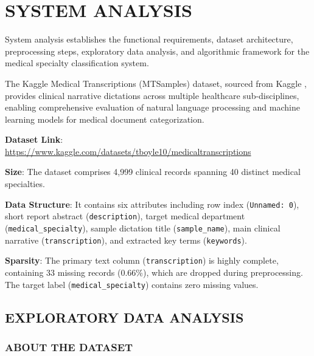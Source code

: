 \clearpage

\section{SYSTEM ANALYSIS}

System analysis establishes the functional requirements, dataset architecture, preprocessing steps, exploratory data analysis, and algorithmic framework for the medical specialty classification system.

The Kaggle Medical Transcriptions (MTSamples) dataset, sourced from Kaggle \cite{mtsamples_dataset}, provides clinical narrative dictations across multiple healthcare sub-disciplines, enabling comprehensive evaluation of natural language processing and machine learning models for medical document categorization.

\textbf{Dataset Link}: \url{https://www.kaggle.com/datasets/tboyle10/medicaltranscriptions}

\textbf{Size}: The dataset comprises 4,999 clinical records spanning 40 distinct medical specialties.

\textbf{Data Structure}: It contains six attributes including row index (\texttt{Unnamed: 0}), short report abstract (\texttt{description}), target medical department (\texttt{medical\_specialty}), sample dictation title (\texttt{sample\_name}), main clinical narrative (\texttt{transcription}), and extracted key terms (\texttt{keywords}).

\textbf{Sparsity}: The primary text column (\texttt{transcription}) is highly complete, containing 33 missing records (0.66\%), which are dropped during preprocessing. The target label (\texttt{medical\_specialty}) contains zero missing values.

\subsection{EXPLORATORY DATA ANALYSIS}

\subsubsection{ABOUT THE DATASET}

